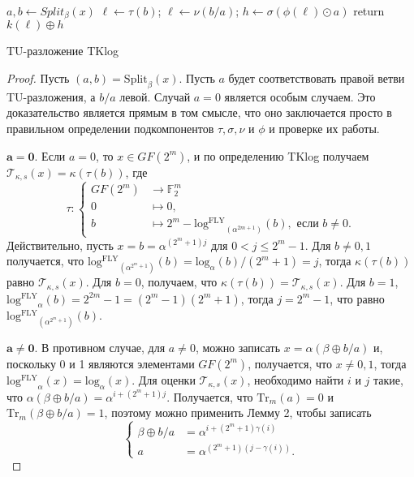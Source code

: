 \begin{algorithm}[htp!]
  $a, b \gets Split_{\beta}(x)$ 
   {
    $\ell \gets \tau(b)$;
  }{
    $\ell \gets \nu(b/a)$;
  }
  $h \gets \sigma(\phi(\ell) \odot a)$ 
  return $k(\ell) \oplus h$ 
\caption{TU-разложение TKlog}
\label{alg:alg02}
\end{algorithm}

\begin{proof}
Пусть \((a, b) = \mathrm{Split}_{\beta}(x)\). Пусть \(a\) будет соответствовать правой ветви TU-разложения, а \(b/a\) левой. Случай \(a = 0\) является особым случаем. Это доказательство является прямым в том смысле, что оно заключается просто в правильном определении подкомпонентов \(\tau, \sigma, \nu\) и \(\phi\) и проверке их работы.

$\bm{a=0.}$ Если \(a = 0\), то \(x \in GF(2^m)\), и по определению TKlog получаем \(\mathscr{T}_{\kappa, s}(x) = \kappa(\tau(b))\), где
\[
\tau : 
\begin{cases}
GF(2^m) & \to \mathbb{F}^m_2 \\
0 & \mapsto 0, \\
b & \mapsto 2^m - \mathrm{log^{FLY}}_{(\alpha^{2m+1})}(b), \text{ если } b \neq 0.
\end{cases}
\]
Действительно, пусть \(x = b = \alpha^{(2^m+1)j}\) для \(0 < j \leq 2^m - 1\). Для \(b \neq 0, 1\) получается, что \(\mathrm{log^{FLY}}_{(\alpha^{2^m+1})}(b) = \mathrm{log}_{\alpha}(b)/(2^m + 1) = j\), тогда \(\kappa(\tau(b))\) равно \(\mathscr{T}_{\kappa, s}(x)\). Для \(b = 0\), получаем, что \(\kappa(\tau(b)) = \mathscr{T}_{\kappa, s}(x)\). Для \(b = 1\), \(\mathrm{log^{FLY}}_{\alpha}(b) = 2^{2m} - 1 = (2^m - 1)(2^m + 1)\), тогда \(j = 2^m - 1\), что равно \(\mathrm{log^{FLY}}_{(\alpha^{2^m+1})}(b)\).

$\bm{a \neq 0.}$ В противном случае, для \(a \neq 0\), можно записать \(x = \alpha(\beta \oplus b/a)\) и, поскольку 0 и 1 являются элементами \(GF(2^m)\), получается, что \(x \neq 0, 1\), тогда \(\mathrm{log^{FLY}}_{\alpha}(x) = \mathrm{log}_{\alpha}(x)\). Для оценки \(\mathscr{T}_{\kappa,s}(x)\), необходимо найти \(i\) и \(j\) такие, что \(\alpha(\beta \oplus b/a) = \alpha^{i+(2^m+1)j}\). Получается, что \(\mathrm{Tr}_m(a) = 0\) и \(\mathrm{Tr}_m(\beta \oplus b/a) = 1\), поэтому можно применить Лемму 2, чтобы записать
\begin{equation}
  \begin{cases}
    \beta \oplus b/a & = \alpha^{i+(2^m+1)\gamma(i)} \\
    a & = \alpha^{(2^m+1)(j-\gamma(i))}.
  \end{cases}
  \label{eq:03}
\end{equation}


\end{proof}
